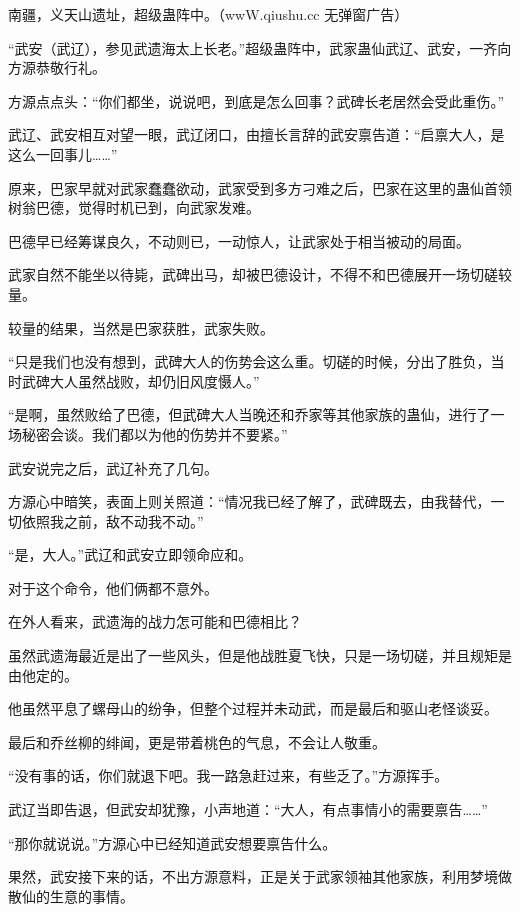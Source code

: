 
\begin{this_body}

南疆，义天山遗址，超级蛊阵中。（wwW.qiushu.cc 无弹窗广告）

“武安（武辽），参见武遗海太上长老。”超级蛊阵中，武家蛊仙武辽、武安，一齐向方源恭敬行礼。

方源点点头：“你们都坐，说说吧，到底是怎么回事？武碑长老居然会受此重伤。”

武辽、武安相互对望一眼，武辽闭口，由擅长言辞的武安禀告道：“启禀大人，是这么一回事儿……”

原来，巴家早就对武家蠢蠢欲动，武家受到多方刁难之后，巴家在这里的蛊仙首领树翁巴德，觉得时机已到，向武家发难。

巴德早已经筹谋良久，不动则已，一动惊人，让武家处于相当被动的局面。

武家自然不能坐以待毙，武碑出马，却被巴德设计，不得不和巴德展开一场切磋较量。

较量的结果，当然是巴家获胜，武家失败。

“只是我们也没有想到，武碑大人的伤势会这么重。切磋的时候，分出了胜负，当时武碑大人虽然战败，却仍旧风度慑人。”

“是啊，虽然败给了巴德，但武碑大人当晚还和乔家等其他家族的蛊仙，进行了一场秘密会谈。我们都以为他的伤势并不要紧。”

武安说完之后，武辽补充了几句。

方源心中暗笑，表面上则关照道：“情况我已经了解了，武碑既去，由我替代，一切依照我之前，敌不动我不动。”

“是，大人。”武辽和武安立即领命应和。

对于这个命令，他们俩都不意外。

在外人看来，武遗海的战力怎可能和巴德相比？

虽然武遗海最近是出了一些风头，但是他战胜夏飞快，只是一场切磋，并且规矩是由他定的。

他虽然平息了螺母山的纷争，但整个过程并未动武，而是最后和驱山老怪谈妥。

最后和乔丝柳的绯闻，更是带着桃色的气息，不会让人敬重。

“没有事的话，你们就退下吧。我一路急赶过来，有些乏了。”方源挥手。

武辽当即告退，但武安却犹豫，小声地道：“大人，有点事情小的需要禀告……”

“那你就说说。”方源心中已经知道武安想要禀告什么。

果然，武安接下来的话，不出方源意料，正是关于武家领袖其他家族，利用梦境做散仙的生意的事情。


\end{this_body}
